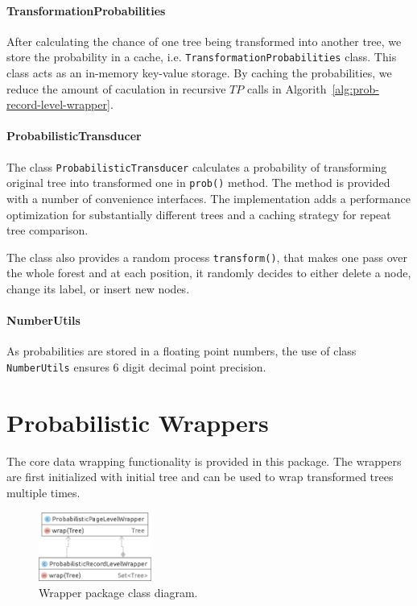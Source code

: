 \paragraph{TransformationProbabilities} After calculating the chance of one tree being transformed into another tree, we store the probability in a cache, i.e. \texttt{TransformationProbabilities} class. This class acts as an in-memory key-value storage. By caching the probabilities, we reduce the amount of caculation in recursive $TP$ calls in Algorith~\ref{alg:prob-record-level-wrapper}.

\paragraph{ProbabilisticTransducer} The class \texttt{ProbabilisticTransducer} calculates a probability of transforming original tree into transformed one in \texttt{prob()} method. The method is provided with a number of convenience interfaces. The implementation adds a performance optimization for substantially different trees and a caching strategy for repeat tree comparison.

The class also provides a random process \texttt{transform()}, that makes one pass over the whole forest and at each position, it randomly decides to either delete a node, change its label, or insert new nodes.

\paragraph{NumberUtils} As probabilities are stored in a floating point numbers, the use of class \texttt{NumberUtils} ensures 6 digit decimal point precision.


\section{Probabilistic Wrappers}

The core data wrapping functionality is provided in this package. The wrappers are first initialized with initial tree and can be used to wrap transformed trees multiple times.

\begin{figure}[h]
	\centering
	\includegraphics[width=0.33\textwidth]{figures/package-wrapper}
	\caption{Wrapper package class diagram.}
	\label{fig:package-wrapper}
\end{figure}

